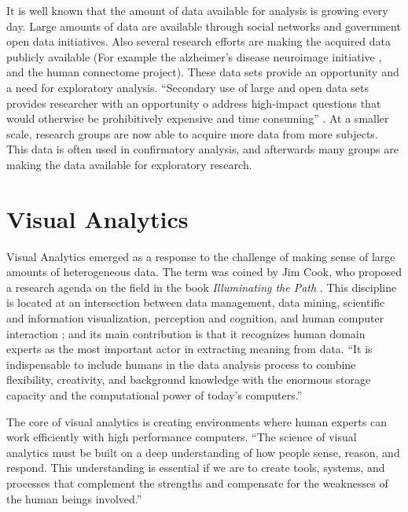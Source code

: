 It is well known that the amount of data available for analysis is growing every day. Large amounts of data are available through social networks and government open data initiatives. Also several research efforts are making the acquired data publicly available (For example the alzheimer's disease neuroimage initiative \autocite{jack_alzheimers_2008}, and the human connectome project\autocite{marcus_human_2013}). These data sets provide an opportunity and a need for exploratory analysis. ``Secondary use of large and open data sets provides researcher with an opportunity o address high-impact questions that would otherwise be prohibitively expensive and time consuming'' \autocite{viangteeravat_giving_2014}. At a smaller scale, research groups are now able to acquire more data from more subjects. This data is often used in confirmatory analysis, and afterwards many groups are making the data available for exploratory research. 

\section{Visual Analytics}

%

Visual Analytics emerged as a response to the challenge of making sense of large amounts of heterogeneous data. The term was coined by Jim Cook, who proposed a research agenda on the field in the book \emph{Illuminating the Path} \autocite{cook_illuminating_2005}. This discipline is located at an intersection between data management, data mining, scientific and information visualization, perception and cognition, and human computer interaction \autocite{keim_visual_2008}; and its main contribution is that it recognizes human domain experts as the most important actor in extracting meaning from data.
``It is indispensable to include humans in the data analysis process to combine flexibility, creativity, and background knowledge with the enormous storage capacity and the computational power of today’s computers.'' \autocite{keim_visual_2008}

The core of visual analytics is creating environments where human experts can work efficiently with high performance computers.
``The science of visual analytics must be built on a deep understanding of how
people sense, reason, and respond. This understanding is essential if we are to create
tools, systems, and processes that complement the strengths and compensate for the
weaknesses of the human beings involved.'' \autocite{cook_illuminating_2005}

